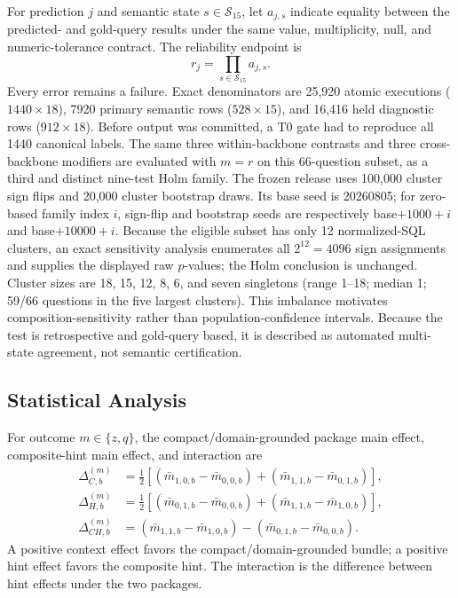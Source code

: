 \documentclass[applsci,article,submit,moreauthors]{Definitions/mdpi}
\begin{document}
For prediction $j$ and semantic state $s\in\mathcal{S}_{15}$, let $a_{j,s}$ indicate equality between the predicted- and gold-query results under the same value, multiplicity, null, and numeric-tolerance contract. The reliability endpoint is
\begin{equation}
r_j=\prod_{s\in\mathcal{S}_{15}} a_{j,s}.
\end{equation}
Every error remains a failure. Exact denominators are 25,920 atomic executions ($1440\times18$), 7920 primary semantic rows ($528\times15$), and 16,416 held diagnostic rows ($912\times18$). Before output was committed, a T0 gate had to reproduce all 1440 canonical labels. The same three within-backbone contrasts and three cross-backbone modifiers are evaluated with $m=r$ on this 66-question subset, as a third and distinct nine-test Holm family. The frozen release uses 100,000 cluster sign flips and 20,000 cluster bootstrap draws. Its base seed is 20260805; for zero-based family index $i$, sign-flip and bootstrap seeds are respectively base$+1000+i$ and base$+10000+i$. Because the eligible subset has only 12 normalized-SQL clusters, an exact sensitivity analysis enumerates all $2^{12}=4096$ sign assignments and supplies the displayed raw $p$-values; the Holm conclusion is unchanged. Cluster sizes are 18, 15, 12, 8, 6, and seven singletons (range 1--18; median 1; 59/66 questions in the five largest clusters). This imbalance motivates composition-sensitivity rather than population-confidence intervals. Because the test is retrospective and gold-query based, it is described as automated multi-state agreement, not semantic certification.

\subsection{Statistical Analysis}
For outcome $m\in\{z,q\}$, the compact/domain-grounded package main effect, composite-hint main effect, and interaction are
\begin{align}
\Delta_{C,b}^{(m)}&=\tfrac12[(\bar m_{1,0,b}-\bar m_{0,0,b})+
(\bar m_{1,1,b}-\bar m_{0,1,b})],\\
\Delta_{H,b}^{(m)}&=\tfrac12[(\bar m_{0,1,b}-\bar m_{0,0,b})+
(\bar m_{1,1,b}-\bar m_{1,0,b})],\\
\Delta_{CH,b}^{(m)}&=(\bar m_{1,1,b}-\bar m_{1,0,b})-
(\bar m_{0,1,b}-\bar m_{0,0,b}).
\end{align}
A positive context effect favors the compact/domain-grounded bundle; a positive hint effect favors the composite hint. The interaction is the difference between hint effects under the two packages.
\end{document}
